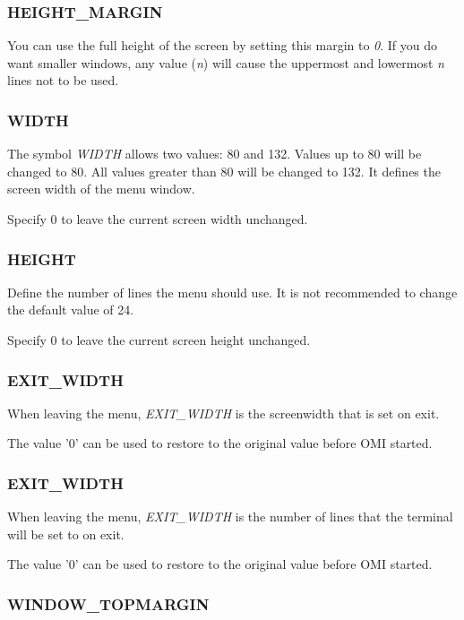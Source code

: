 \documentclass[a4paper]{book}
\begin{document}
\subsubsection{HEIGHT{\_}MARGIN}

You can use the full height of the screen by setting this margin to \textsl{0}. If 
you do want smaller windows, any value (\textit{n}) will cause the uppermost and 
lowermost \textit{n} lines not to be used.

\subsubsection{WIDTH}

The symbol \textsl{WIDTH} allows two values: 80 and 132. Values up to 80 will be 
changed to 80. All values greater than 80 will be changed to 132. It defines 
the screen width of the menu window.

Specify 0 to leave the current screen width unchanged.

\subsubsection{HEIGHT}

Define the number of lines the menu should use. It is not recommended to 
change the default value of 24.

Specify 0 to leave the current screen height unchanged.

\subsubsection{EXIT{\_}WIDTH}

When leaving the menu, \textsl{EXIT{\_}WIDTH} is the screenwidth that is set on 
exit.

The value '0' can be used to restore to the original value before OMI started.

\subsubsection{EXIT{\_}WIDTH}

When leaving the menu, \textsl{EXIT{\_}WIDTH} is the number of lines that the terminal will be set to on exit.

The value '0' can be used to restore to the original value before OMI started.

\subsubsection{WINDOW{\_}TOPMARGIN}
\end{document}
